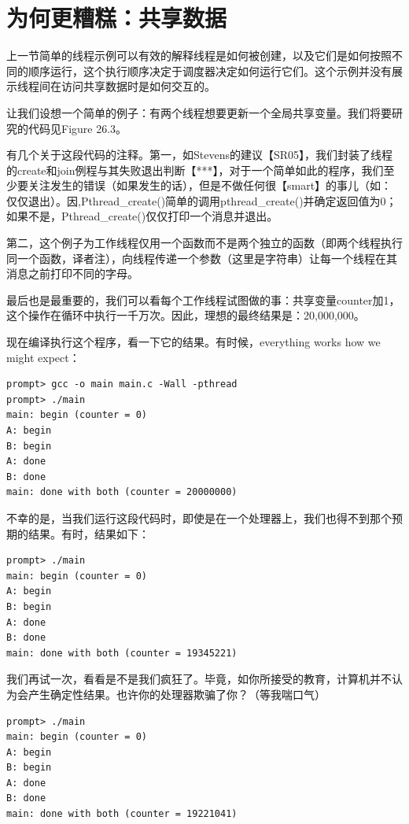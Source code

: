 
\section{为何更糟糕：共享数据}
上一节简单的线程示例可以有效的解释线程是如何被创建，以及它们是如何按照不同的顺序运行，这个执行顺序决定于调度器决定如何运行它们。这个示例并没有展示线程间在访问共享数据时是如何交互的。

让我们设想一个简单的例子：有两个线程想要更新一个全局共享变量。我们将要研究的代码见Figure 26.3。

有几个关于这段代码的注释。第一，如Stevens的建议【SR05】，我们封装了线程的create和join例程与其失败退出判断【***】，对于一个简单如此的程序，我们至少要关注发生的错误（如果发生的话），但是不做任何很【smart】的事儿（如：仅仅退出）。因,Pthread\_create()简单的调用pthread\_create()并确定返回值为0；如果不是，Pthread\_create()仅仅打印一个消息并退出。

第二，这个例子为工作线程仅用一个函数而不是两个独立的函数（即两个线程执行同一个函数，译者注），向线程传递一个参数（这里是字符串）让每一个线程在其消息之前打印不同的字母。

最后也是最重要的，我们可以看每个工作线程试图做的事：共享变量counter加1，这个操作在循环中执行一千万次。因此，理想的最终结果是：20,000,000。

现在编译执行这个程序，看一下它的结果。有时候，everything works how we might expect：
\begin{verbatim}
prompt> gcc -o main main.c -Wall -pthread
prompt> ./main
main: begin (counter = 0)
A: begin
B: begin
A: done
B: done
main: done with both (counter = 20000000)
\end{verbatim}

不幸的是，当我们运行这段代码时，即使是在一个处理器上，我们也得不到那个预期的结果。有时，结果如下：
\begin{verbatim}
prompt> ./main
main: begin (counter = 0)
A: begin
B: begin
A: done
B: done
main: done with both (counter = 19345221)
\end{verbatim}

我们再试一次，看看是不是我们疯狂了。毕竟，如你所接受的教育，计算机并不认为会产生确定性结果。也许你的处理器欺骗了你？（等我喘口气）
\begin{verbatim}
prompt> ./main
main: begin (counter = 0)
A: begin
B: begin
A: done
B: done
main: done with both (counter = 19221041)
\end{verbatim}

